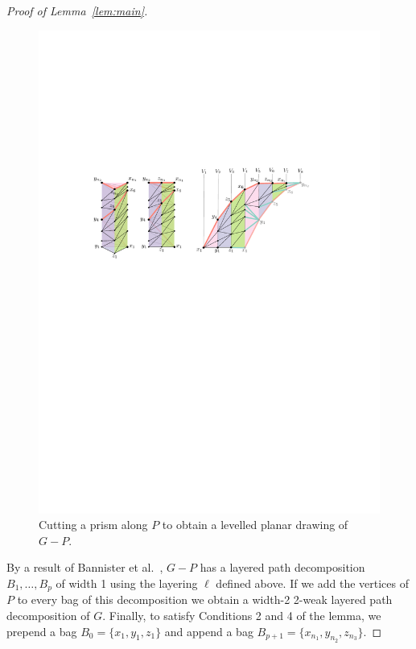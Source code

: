 \documentclass{jgaa-art}
\newcommand{\etal}{et al.}
\newcommand{\figlabel}[1]{\label{fig:#1}}
\newcommand{\figref}[1]{\mbox{Figure~\ref{fig:#1}}}
\newcommand{\lemref}[1]{Lemma~\ref{lem:#1}}
\begin{document}
\begin{proof}[Proof of \lemref{main}]

  \begin{figure}
   \begin{center}
      \includegraphics[width=0.95\columnwidth]{figs/prism}
   \end{center}
   \caption{Cutting a prism along $P$ to obtain a levelled planar
    drawing of $G-P$.}
   \figlabel{prism}
  \end{figure}


  By a result of Bannister \etal\ \cite[Proof of
  Theorem~5]{bannister2018track}, $G-P$ has a layered
  path decomposition $B_1,\ldots,B_p$ of width 1 using the layering
  $\ell$ defined above.  If we add the vertices of $P$ to every bag
  of this decomposition we obtain a width-2 2-weak layered path
  decomposition of $G$.  Finally, to satisfy Conditions 2 and 4 of
  the lemma, we prepend a bag $B_0=\{x_1,y_1,z_1\}$ and append a bag
  $B_{p+1}=\{x_{n_1},y_{n_2},z_{n_3}\}$.
\end{proof}
\end{document}
